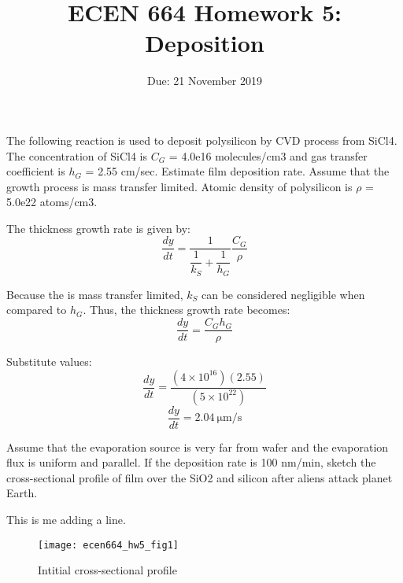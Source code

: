 \documentclass[10pt,a4paper]{article}
\title{ECEN 664 Homework 5: Deposition}
\date{Due: 21 November 2019}
\begin{document}
	\maketitle

	{}
	
	The following reaction is used to deposit polysilicon by CVD process from SiCl4. The
	concentration of SiCl4 is $C_{G}$ = 4.0e16 molecules/cm3 and gas transfer coefficient is
	$h_{G}$ = 2.55 cm/sec. Estimate film deposition rate. Assume that the growth process is mass transfer limited. Atomic density of polysilicon is $\rho$ = 5.0e22 atoms/cm3.
	
	The thickness growth rate is given by:
	\[\dfrac{dy}{dt} = \dfrac{1}{\dfrac{1}{k_{S}} + \dfrac{1}{h_{G}}} \dfrac{C_{G}}{\rho}\]
	
	Because the is mass transfer limited, $k_{S}$ can be considered negligible when compared to $h_{G}$. Thus, the thickness growth rate becomes:
	\[\dfrac{dy}{dt} = \dfrac{C_{G}h_{G}}{\rho}\]
	
	Substitute values:
	\[\dfrac{dy}{dt} = \dfrac{(4 \times 10^{16})(2.55)}{(5 \times 10^{22})}\]
	\[\boxed{\dfrac{dy}{dt} = \SI{2.04}{\micro\meter/\second}}\] \bigbreak
	
	\clearpage
	
	{}
	
	Assume that the evaporation source is very far from wafer and the evaporation flux is
	uniform and parallel. If the deposition rate is 100 nm/min, sketch the cross-sectional
	profile of film over the SiO2 and silicon after aliens attack planet Earth.
	
	This is me adding a line.
	
	\vspace*{10mm}

	\begin{figure}[h]
		\centering
		\texttt{[image: ecen664\_hw5\_fig1]}
		\caption{Intitial cross-sectional profile}
	\end{figure}

	\vspace*{20mm}
\end{document}
